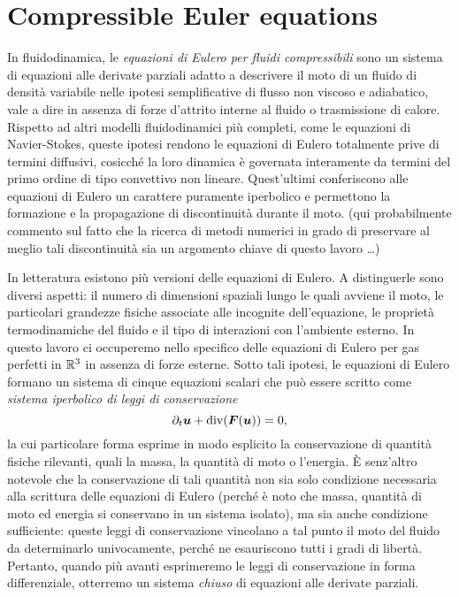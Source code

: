 \graphicspath{{./figures/chapter1/}}
\lstset{inputpath = ../MATLAB}

\chapter{Compressible Euler equations} \label{ch:euler-equations}

In fluidodinamica, le \emph{equazioni di Eulero per fluidi compressibili}
sono un sistema di equazioni alle derivate parziali
adatto a descrivere il moto di un fluido di densità variabile nelle ipotesi
semplificative di flusso non viscoso e adiabatico, vale a dire
in assenza di forze d'attrito interne al fluido o trasmissione di calore.
Rispetto ad altri modelli fluidodinamici più completi,
come le equazioni di Navier-Stokes, queste ipotesi rendono
le equazioni di Eulero totalmente prive di termini diffusivi,
cosicché la loro dinamica è governata interamente da termini del primo ordine
di tipo convettivo non lineare. Quest'ultimi
conferiscono alle equazioni di Eulero un carattere puramente iperbolico
e permettono la formazione e la propagazione di discontinuità durante il moto.
(qui probabilmente commento sul fatto che la ricerca di metodi numerici in grado di
preservare al meglio tali discontinuità sia un argomento chiave
di questo lavoro \dots)

In letteratura esistono più versioni delle equazioni di Eulero.
A distinguerle sono diversi aspetti:
il numero di dimensioni spaziali lungo le quali avviene il moto,
le particolari grandezze fisiche associate alle incognite dell'equazione,
le proprietà termodinamiche del fluido
e il tipo di interazioni con l'ambiente esterno.
In questo lavoro ci occuperemo nello specifico delle
equazioni di Eulero per gas perfetti in $\mathbb{R}^3$ in assenza di forze esterne.
Sotto tali ipotesi, le equazioni di Eulero formano un sistema di
cinque equazioni scalari che può essere scritto come
\emph{sistema iperbolico di leggi di conservazione}
\begin{equation} \label{eq:sistema-iperbolico-di-leggi-di-conservazione}
\partial_t \bm{u} + \operatorname{div}(\bm{F}(\bm{u})) = 0,
\end{equation}
la cui particolare forma esprime in modo esplicito
la conservazione di quantità fisiche rilevanti,
quali la massa, la quantità di moto o l'energia.
È senz'altro notevole che la conservazione di tali quantità
non sia solo condizione necessaria alla scrittura delle equazioni
di Eulero (perché è noto che massa, quantità di moto
ed energia si conservano in un sistema isolato),
ma sia anche condizione sufficiente: queste leggi
di conservazione vincolano a tal punto il moto del fluido
da determinarlo univocamente, perché ne esauriscono tutti i gradi
di libertà.
Pertanto, quando più avanti esprimeremo le leggi di conservazione
in forma differenziale, otterremo un sistema \emph{chiuso} di equazioni
alle derivate parziali.

